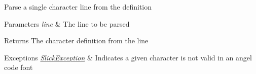 Parse a single character line from the definition


\begin{DoxyParams}{Parameters}
{\em line} & The line to be parsed \\
\hline
\end{DoxyParams}
\begin{DoxyReturn}{Returns}
The character definition from the line 
\end{DoxyReturn}

\begin{DoxyExceptions}{Exceptions}
{\em \mbox{\hyperlink{classorg_1_1newdawn_1_1slick_1_1_slick_exception}{Slick\+Exception}}} & Indicates a given character is not valid in an angel code font \\
\hline
\end{DoxyExceptions}

